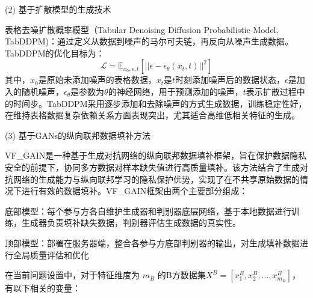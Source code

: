 (2) 基于扩散模型的生成技术

表格去噪扩散概率模型（Tabular Denoising Diffusion Probabilistic Model, TabDDPM)：通过定义从数据到噪声的马尔可夫链，再反向从噪声生成数据。TabDDPM的优化目标为：
\begin{equation}
	\mathcal{L} = \mathbb{E}_{x_0, \epsilon, t}[||\epsilon - \epsilon_\theta(x_t, t)||^2]
\end{equation}
其中，$x_0$是原始未添加噪声的表格数据，$x_t$是$t$时刻添加噪声后的数据状态，$\epsilon$是加入的随机噪声，$\epsilon_\theta$是参数为$\theta$的神经网络，用于预测添加的噪声，$t$表示扩散过程中的时间步。TabDDPM采用逐步添加和去除噪声的方式生成数据，训练稳定性好，在维持表格数据复杂依赖关系方面表现突出，尤其适合高维低相关特征的生成。

(3) 基于GANs的纵向联邦数据填补方法

VF\_GAIN是一种基于生成对抗网络的纵向联邦数据填补框架，旨在保护数据隐私安全的前提下，协同多方数据对样本缺失值进行高质量填补。该方法结合了生成对抗网络的生成能力与纵向联邦学习的隐私保护优势，实现了在不共享原始数据的情况下进行有效的数据填补。VF\_GAIN框架由两个主要部分组成：

底部模型：每个参与方各自维护生成器和判别器底层网络，基于本地数据进行训练，生成器负责填补缺失数据，判别器评估生成数据的真实性。

顶部模型：部署在服务器端，整合各参与方底部判别器的输出，对生成填补数据进行全局质量评估和优化

在当前问题设置中，对于特征维度为 $m_B$ 的B方数据集$X^B=[x_1^B, x_2^B,\dots,x_{m_B}^B]$，有以下相关的变量：

